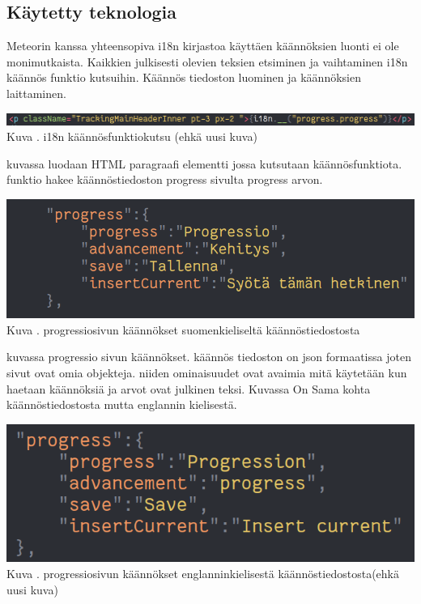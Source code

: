 \documentclass[11pt,a4paper,titlepage,oneside]{article}
\begin{document}
\subsection{Käytetty teknologia}
Meteorin kanssa yhteensopiva i18n kirjastoa käyttäen käännöksien luonti ei ole monimutkaista.
Kaikkien julkisesti olevien teksien etsiminen ja vaihtaminen i18n käännös funktio kutsuihin.
Käännös tiedoston luominen ja käännöksien laittaminen.
\bigskip

\includegraphics[width = 15cm]{src/public/oppar/translationcall.png}\\
Kuva \getImgCount. {} i18n käännösfunktiokutsu (ehkä uusi kuva)
\medskip

kuvassa luodaan HTML paragraafi elementti jossa kutsutaan käännösfunktiota. funktio hakee käännöstiedoston progress sivulta progress arvon.
\bigskip

\includegraphics[width = 15cm]{src/public/oppar/translationfile.png}\\
Kuva \getImgCount. {} progressiosivun käännökset suomenkieliseltä käännöstiedostosta
\medskip

kuvassa progressio sivun käännökset. käännös tiedoston on json formaatissa joten sivut ovat omia objekteja. 
niiden ominaisuudet ovat avaimia mitä käytetään kun haetaan käännöksiä ja arvot ovat julkinen teksi.
Kuvassa \nextImageCount {} On Sama kohta käännöstiedostosta mutta englannin kielisestä.
\bigskip


\includegraphics[width = 15cm]{src/public/oppar/translationfileEng.png}\\
Kuva \getImgCount {}. progressiosivun käännökset englanninkielisestä käännöstiedostosta(ehkä uusi kuva)
\medskip
\end{document}
